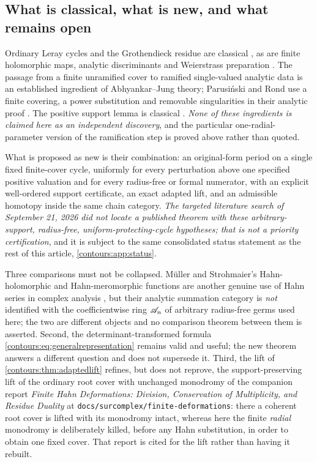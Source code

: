 \documentclass[11pt,letterpaper]{article}
\theoremstyle{definition}
\theoremstyle{remark}
\numberwithin{equation}{section}
\begin{document}
\subsection{What is classical, what is new, and what remains open}
\label{contours:subsec:untransformedscope}
Ordinary Leray cycles and the Grothendieck residue are classical
\cite{GriffithsHarris,TajimaNabeshima,Tsikh}, as are finite holomorphic maps,
analytic discriminants and Weierstrass preparation \cite{GrauertRemmert}. The
passage from a finite unramified cover to ramified single-valued analytic data
is an established ingredient of Abhyankar--Jung theory; Parusi\'nski and Rond
use a finite covering, a power substitution and removable singularities in their
analytic proof \cite[Prop.~2.1]{ParRond}. The positive support lemma is
classical \cite{Neumann,Higman}. \emph{None of these ingredients is claimed here
as an independent discovery}, and the particular one-radial-parameter version of
the ramification step is proved above rather than quoted.

What is proposed as new is their combination: an original-form period on a
single fixed finite-cover cycle, uniformly for every perturbation above one
specified positive valuation and for every radius-free or formal numerator, with
an explicit well-ordered support certificate, an exact adapted lift, and an
admissible homotopy inside the same chain category. \emph{The targeted literature
search of September 21, 2026 did not locate a published theorem with these
arbitrary-support, radius-free, uniform-protecting-cycle hypotheses; that is not
a priority certification}, and it is subject to the same consolidated status
statement as the rest of this article, \cref{contours:app:status}.

Three comparisons must not be collapsed. M\"uller and Strohmaier's
Hahn-holomorphic and Hahn-meromorphic functions are another genuine use of Hahn
series in complex analysis \cite{MuellerStrohmaier}, but their analytic
summation category is \emph{not} identified with the coefficientwise ring $\mathscr A_n$
of arbitrary radius-free germs used here; the two are different objects and no
comparison theorem between them is asserted. Second, the determinant-transformed
formula \eqref{contours:eq:generalrepresentation} remains valid and useful; the
new theorem answers a different question and does not supersede it. Third, the
lift of \cref{contours:thm:adaptedlift} refines, but does not reprove, the
support-preserving lift of the ordinary root cover with unchanged monodromy of
the companion report \emph{Finite Hahn Deformations: Division, Conservation of
Multiplicity, and Residue Duality} \cite{FiniteDeformations} at
\texttt{docs/surcomplex/finite-deformations}: there a coherent root cover is
lifted with its monodromy intact, whereas here the finite \emph{radial}
monodromy is deliberately killed, before any Hahn substitution, in order to
obtain one fixed cover. That report is cited for the lift rather than having it
rebuilt.
\end{document}
